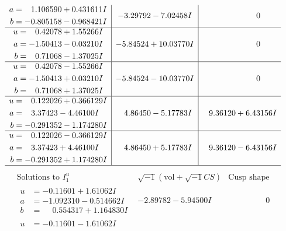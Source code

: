 \documentclass[1p]{elsarticle_modified}
\theoremstyle{definition}
\newcommand{\I}{\sqrt{-1}}
\begin{document}
$$\begin{array}{c|c|c}
\begin{aligned}
a &= \phantom{-}1.106590 + 0.431611 I \\
b &= -0.805158 - 0.968421 I\end{aligned}
 & -3.29792 - 7.02458 I & \phantom{-0.000000 } 0 \\ \hline\begin{aligned}
u &= \phantom{-}0.42078 + 1.55266 I \\
a &= -1.50413 - 0.03210 I \\
b &= \phantom{-}0.71068 - 1.37025 I\end{aligned}
 & -5.84524 + 10.03770 I & \phantom{-0.000000 } 0 \\ \hline\begin{aligned}
u &= \phantom{-}0.42078 - 1.55266 I \\
a &= -1.50413 + 0.03210 I \\
b &= \phantom{-}0.71068 + 1.37025 I\end{aligned}
 & -5.84524 - 10.03770 I & \phantom{-0.000000 } 0 \\ \hline\begin{aligned}
u &= \phantom{-}0.122026 + 0.366129 I \\
a &= \phantom{-}3.37423 - 4.46100 I \\
b &= -0.291352 - 1.174280 I\end{aligned}
 & \phantom{-}4.86450 - 5.17783 I & \phantom{-}9.36120 + 6.43156 I \\ \hline\begin{aligned}
u &= \phantom{-}0.122026 - 0.366129 I \\
a &= \phantom{-}3.37423 + 4.46100 I \\
b &= -0.291352 + 1.174280 I\end{aligned}
 & \phantom{-}4.86450 + 5.17783 I & \phantom{-}9.36120 - 6.43156 I\\
 \hline 
 \end{array}$$\newpage$$\begin{array}{c|c|c}  
\text{Solutions to }I^u_{1}& \I (\text{vol} + \sqrt{-1}CS) & \text{Cusp shape}\\
 \hline 
\begin{aligned}
u &= -0.11601 + 1.61062 I \\
a &= -1.092310 - 0.514662 I \\
b &= \phantom{-}0.554317 + 1.164830 I\end{aligned}
 & -2.89782 - 5.94500 I & \phantom{-0.000000 } 0 \\ \hline\begin{aligned}
u &= -0.11601 - 1.61062 I \\

\end{aligned}
\end{array}$$
\end{document}
